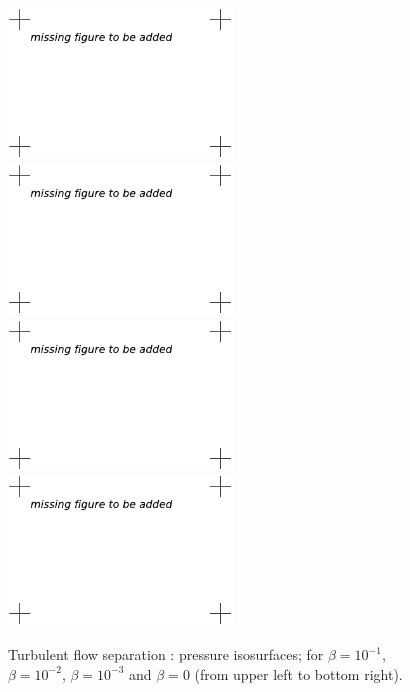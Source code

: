 \begin{figure}
\centering
\includegraphics[height=4cm]{chapters/hoffman-1/pdf/Hoffman_fig3a.pdf}
\includegraphics[height=4cm]{chapters/hoffman-1/pdf/Hoffman_fig3b.pdf}
\includegraphics[height=4cm]{chapters/hoffman-1/pdf/Hoffman_fig3c.pdf}
\includegraphics[height=4cm]{chapters/hoffman-1/pdf/Hoffman_fig3d.pdf}
\caption{Turbulent flow separation \cite{JanssonHoffman2009}: pressure isosurfaces; for $\beta = 10^{-1}$, $\beta = 10^{-2}$, $\beta = 10^{-3}$ and $\beta = 0$ (from upper left to bottom right).}
\label{fig:2}
\end{figure}

